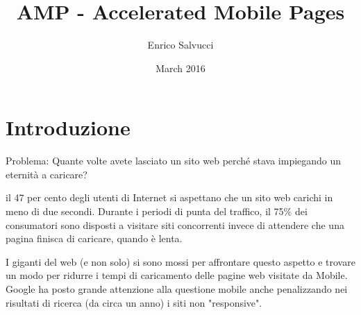 \documentclass{article}
\title{AMP - Accelerated Mobile Pages}
\author{Enrico Salvucci}
\date{March 2016}
\begin{document}
\maketitle

\section{Introduzione}

Problema: Quante volte avete lasciato un sito web perché stava impiegando un eternità a caricare?

il 47 per cento degli utenti di Internet si aspettano che un sito web carichi in meno di due secondi.
Durante i periodi di punta del traffico, il 75\% dei consumatori sono disposti a visitare siti concorrenti invece di attendere che una pagina finisca di caricare, quando è lenta.

I giganti del web (e non solo) si sono mossi per affrontare questo aspetto e trovare un modo per ridurre i tempi di caricamento delle pagine web visitate da Mobile.
Google ha posto grande attenzione alla questione mobile anche penalizzando nei risultati di ricerca (da circa un anno) i siti non "responsive".
\end{document}
